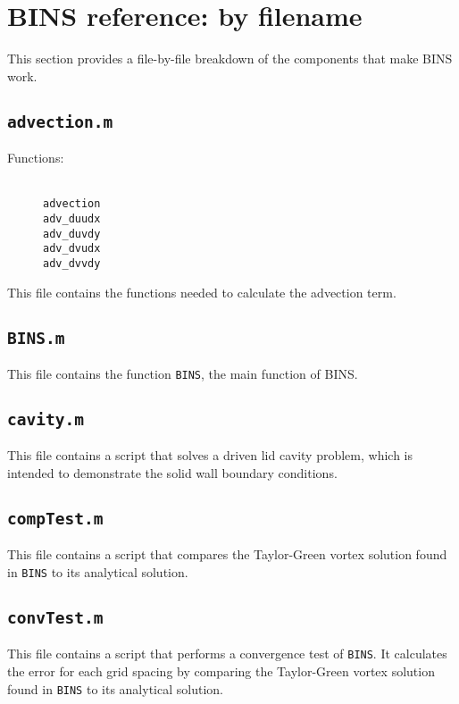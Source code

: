 \documentclass[12pt]{article}
\begin{document}
\section{BINS reference: by filename}
This section provides a file-by-file breakdown of the components that make BINS work.

\subsection{\texttt{advection.m}}
\begin{description}
\item[Functions:] \hfill \\ \texttt{advection} \\ \texttt{adv\_duudx} \\ \texttt{adv\_duvdy} \\  \texttt{adv\_dvudx} \\  \texttt{adv\_dvvdy}
\end{description}
This file contains the functions needed to calculate the advection term.

\subsection{\texttt{BINS.m}}
This file contains the function \texttt{BINS}, the main function of BINS.

\subsection{\texttt{cavity.m}}
This file contains a script that solves a driven lid cavity problem, which is intended to demonstrate the solid wall boundary conditions.

\subsection{\texttt{compTest.m}}
This file contains a script that compares the Taylor-Green vortex solution found in \texttt{BINS} to its analytical solution.

\subsection{\texttt{convTest.m}}
This file contains a script that performs a convergence test of \texttt{BINS}.  It calculates the error for each grid spacing by comparing the Taylor-Green vortex solution found in \texttt{BINS} to its analytical solution.
\end{document}
